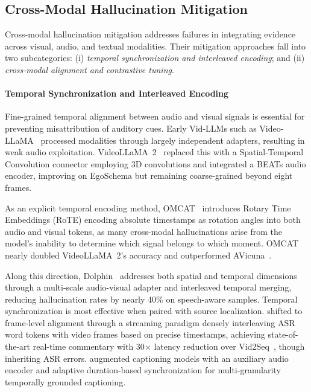 \documentclass[10pt]{article} %
\begin{document}
\subsection{Cross-Modal Hallucination Mitigation}
\label{subsec:cross-modal-hallucination-mitigation}
Cross-modal hallucination mitigation addresses failures in integrating evidence across visual, audio, and textual modalities. Their mitigation approaches fall into two subcategories: (i) \emph{temporal synchronization and interleaved encoding}; and (ii) \emph{cross-modal alignment and contrastive tuning}.

\paragraph{Temporal Synchronization and Interleaved Encoding}

Fine-grained temporal alignment between audio and visual signals is essential for preventing misattribution of auditory cues. Early Vid-LLMs such as Video-LLaMA~\citep{Zhang2023VideoLLaMAAI} processed modalities through largely independent adapters, resulting in weak audio exploitation. VideoLLaMA~2~\citep{Cheng2024VideoLLaMA2A} replaced this with a Spatial-Temporal Convolution connector employing 3D convolutions and integrated a BEATs audio encoder, improving on EgoSchema but remaining coarse-grained beyond eight frames.

As an explicit temporal encoding method, OMCAT~\citep{Goel2024OMCATOC} introduces Rotary Time Embeddings (RoTE) encoding absolute timestamps as rotation angles into both audio and visual tokens, as many cross-modal hallucinations arise from the model's inability to determine which signal belongs to which moment. OMCAT nearly doubled VideoLLaMA~2's accuracy and outperformed AVicuna~\citep{Shu2023AudioVisualLF}.

Along this direction, Dolphin~\citep{Guo2025AlignedBL} addresses both spatial and temporal dimensions through a multi-scale audio-visual adapter and interleaved temporal merging, reducing hallucination rates by nearly 40\% on speech-aware samples. Temporal synchronization is most effective when paired with source localization. \citet{Chen2025LiveLV} shifted to frame-level alignment through a streaming paradigm densely interleaving ASR word tokens with video frames based on precise timestamps, achieving state-of-the-art real-time commentary with 30$\times$ latency reduction over Vid2Seq~\citep{Yang2023Vid2SeqLP}, though inheriting ASR errors. \citet{Ge2025ARCHunyuanVideo7BSV} augmented captioning models with an auxiliary audio encoder and adaptive duration-based synchronization for multi-granularity temporally grounded captioning.
\end{document}
